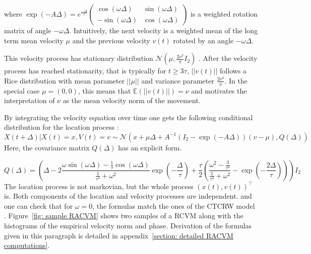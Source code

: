 \documentclass[11pt]{article}
\newcommand {\E}{\mathbb{E}}
\newcommand {\1}{\mathbb{1}}
\begin{document}
where $\exp(-A\Delta)=e^{\frac{-\Delta}{\tau}} \begin{pmatrix} \cos(\omega \Delta) & \sin(\omega \Delta) \\ -\sin(\omega \Delta) & \cos(\omega \Delta) \end{pmatrix}$ is a weighted rotation matrix of angle $-\omega \Delta$.
Intuitively, the next velocity is a weighted mean of the long term mean velocity $\mu$ and the previous velocity $v(t)$ rotated by an angle $-\omega \Delta$.


This velocity process has stationary distribution $\mathcal{N}\left(\mu,\frac{2\nu^2}{\pi} I_2\right)$ \cite{gurarie_correlated_2017}. After the velocity process has reached stationarity, that is typically for $t \geq 3\tau$, $\vert \vert v(t) \vert \vert$ follows a Rice distribution with mean parameter $\vert \vert \mu \vert \vert$ and variance parameter $\frac{2\nu^2}{\pi}$. In the special case $\mu=(0,0)$, this means that $\E(\vert \vert v(t) \vert \vert)=\nu$ and motivates the interpretation of $\nu$ as the mean velocity norm of the movement.

By integrating the velocity equation over time one gets the following conditional distribution for the location process :
\begin{equation}
	X(t+\Delta) \vert X(t)=x, V(t)=v \sim \mathcal{N}\left(x+\mu \Delta+A^{-1} \left( I_2-\exp(-A\Delta)\right)(v-\mu),Q(\Delta)\right)  
\end{equation}
Here, the covariance matrix $Q(\Delta)$ has an explicit form.

\[
Q(\Delta)=\left( \Delta-2 \frac{\omega \sin(\omega \Delta)-\frac{1}{\tau} \cos(\omega \Delta)}{\frac{1}{\tau^2}+\omega^2 } \exp\left( -\frac{\Delta}{\tau} \right) +\frac{\tau}{2} \left( \frac{\omega^2-\frac{3}{\tau^2}}{\frac{1}{\tau^2}+\omega^2}-\exp\left( -\frac{2\Delta}{\tau}\right)\right) \right) I_2
\]
The location process is not markovian, but the whole process $(x(t), v(t))^\top$ is.
Both components of the location and velocity processes are independent.
and one can check that for $\omega=0$, the formulas match the ones of the  CTCRW model \cite{johnson_continuoustime_2008}. Figure~\ref{fig: sample RACVM} shows two samples of a RCVM along with the histograms of the empirical velocity norm and phase. Derivation of the formulas given in this paragraph is detailed in appendix~\ref{section: detailed RACVM computations}.\\
\end{document}

